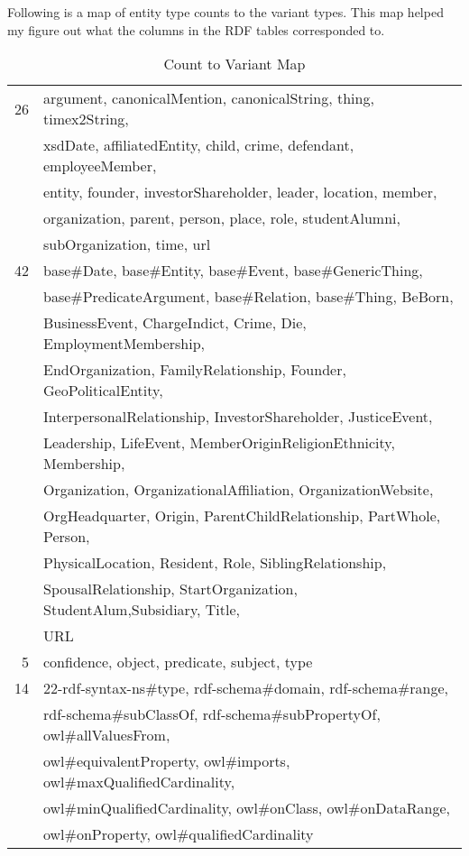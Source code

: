 \documentclass{tufte-handout}
\begin{document}
Following is a map of entity type counts to the variant types. This map helped
my figure out what the columns in the RDF tables corresponded to.
\begin{table}[htbp]
  \centering
  \begin{tabular}{r l}
    26 & argument, canonicalMention, canonicalString, thing, timex2String, \\
       &  xsdDate, affiliatedEntity, child, crime, defendant, employeeMember, \\
       &  entity, founder, investorShareholder, leader, location, member, \\
       &  organization, parent, person, place, role, studentAlumni, \\
       &  subOrganization, time, url \\\midrule
    42 & base\#Date, base\#Entity, base\#Event, base\#GenericThing, \\
       &  base\#PredicateArgument, base\#Relation, base\#Thing, BeBorn,\\
       &  BusinessEvent, ChargeIndict, Crime, Die, EmploymentMembership,\\
       &  EndOrganization, FamilyRelationship, Founder, GeoPoliticalEntity,\\
       &  InterpersonalRelationship, InvestorShareholder, JusticeEvent,\\
       &  Leadership, LifeEvent, MemberOriginReligionEthnicity, Membership,\\
       &  Organization, OrganizationalAffiliation, OrganizationWebsite,\\
       &  OrgHeadquarter, Origin, ParentChildRelationship, PartWhole, Person,\\
       &  PhysicalLocation, Resident, Role, SiblingRelationship,\\
       &  SpousalRelationship, StartOrganization, StudentAlum,Subsidiary, Title,\\
       &  URL \\\midrule
    5  & confidence, object, predicate, subject, type \\\midrule
    14 & 22-rdf-syntax-ns\#type, rdf-schema\#domain, rdf-schema\#range,\\
       &  rdf-schema\#subClassOf, rdf-schema\#subPropertyOf, owl\#allValuesFrom,\\
       &  owl\#equivalentProperty, owl\#imports, owl\#maxQualifiedCardinality,\\
       &  owl\#minQualifiedCardinality, owl\#onClass, owl\#onDataRange,\\
       &  owl\#onProperty, owl\#qualifiedCardinality
  \end{tabular}
  \caption{Count to Variant Map}
  \label{tab:count-to-variant}
\end{table}
\end{document}
